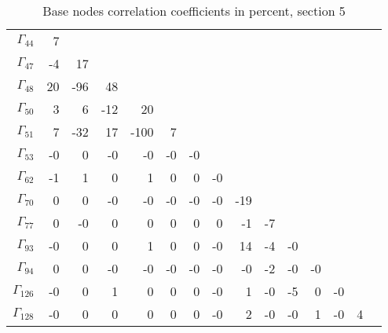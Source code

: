 {\begin{table}
\begin{center}
\begin{minipage}{\linewidth}
\begin{center}
\ifhevea\else
\end{center}
\end{minipage}
\fi
\end{center}
\ifhevea\end{table}\fi
\ifhevea\begin{table}\fi%
\begin{center}
\ifhevea
\caption{Base nodes correlation coefficients in percent, section 5\label{tab:tau:br-fit-corr5}}%
\else
\begin{minipage}{\linewidth}
\begin{center}
\label{tab:tau:br-fit-corr5}%
\fi
\begin{envsmall}
\begin{center}
\renewcommand*{\arraystretch}{1.1}%
\begin{tabular}{rrrrrrrrrrrrrrr}
\hline
\( \Gamma_{44} \) &    7 &  &  &  &  &  &  &  &  &  &  &  &  &  \\
\( \Gamma_{47} \) &   -4 &   17 &  &  &  &  &  &  &  &  &  &  &  &  \\
\( \Gamma_{48} \) &   20 &  -96 &   48 &  &  &  &  &  &  &  &  &  &  &  \\
\( \Gamma_{50} \) &    3 &    6 &  -12 &   20 &  &  &  &  &  &  &  &  &  &  \\
\( \Gamma_{51} \) &    7 &  -32 &   17 & -100 &    7 &  &  &  &  &  &  &  &  &  \\
\( \Gamma_{53} \) &   -0 &    0 &   -0 &   -0 &   -0 &   -0 &  &  &  &  &  &  &  &  \\
\( \Gamma_{62} \) &   -1 &    1 &    0 &    1 &    0 &    0 &   -0 &  &  &  &  &  &  &  \\
\( \Gamma_{70} \) &    0 &    0 &   -0 &   -0 &   -0 &   -0 &   -0 &  -19 &  &  &  &  &  &  \\
\( \Gamma_{77} \) &    0 &   -0 &    0 &    0 &    0 &    0 &    0 &   -1 &   -7 &  &  &  &  &  \\
\( \Gamma_{93} \) &   -0 &    0 &    0 &    1 &    0 &    0 &   -0 &   14 &   -4 &   -0 &  &  &  &  \\
\( \Gamma_{94} \) &    0 &    0 &   -0 &   -0 &   -0 &   -0 &   -0 &   -0 &   -2 &   -0 &   -0 &  &  &  \\
\( \Gamma_{126} \) &   -0 &    0 &    1 &    0 &    0 &    0 &   -0 &    1 &   -0 &   -5 &    0 &   -0 &  &  \\
\( \Gamma_{128} \) &   -0 &    0 &    0 &    0 &    0 &    0 &   -0 &    2 &   -0 &   -0 &    1 &   -0 &    4 &  \\

\end{tabular}
\end{center}
\end{envsmall}
\end{center}
\end{minipage}
\end{center}
\end{table}}
